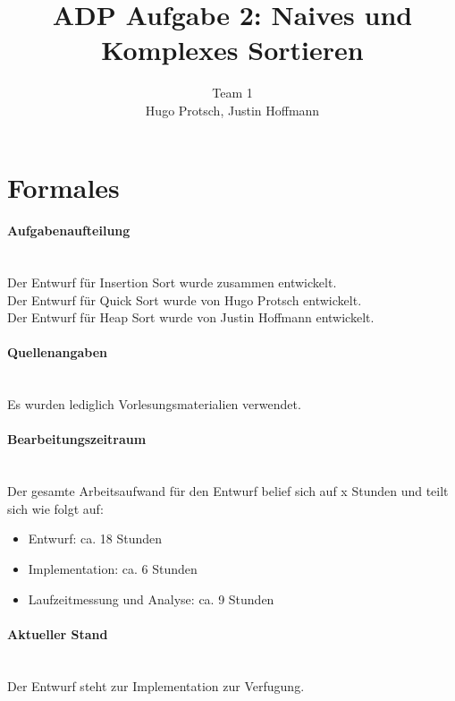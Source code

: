 \documentclass[11pt]{article}
\title{ADP Aufgabe 2: Naives und Komplexes Sortieren}
\author{Team 1\\Hugo Protsch, Justin Hoffmann}
\begin{document}
    \maketitle

    \tableofcontents

    \newpage


    \section{Formales}\label{sec:Formales}

    \paragraph*{Aufgabenaufteilung}\mbox{}\\
    Der Entwurf für Insertion Sort wurde zusammen entwickelt.\\
    Der Entwurf für Quick Sort wurde von Hugo Protsch entwickelt.\\
    Der Entwurf für Heap Sort wurde von Justin Hoffmann entwickelt.

    \paragraph*{Quellenangaben}\mbox{}\\
    Es wurden lediglich Vorlesungsmaterialien verwendet.

    \paragraph*{Bearbeitungszeitraum}\mbox{}\\
    Der gesamte Arbeitsaufwand für den Entwurf belief sich auf x Stunden%
    und teilt sich wie folgt auf:
    \begin{itemize}
        \setlength\itemsep{0em}
        \item Entwurf: ca. 18 Stunden
        \item Implementation: ca. 6 Stunden %
        \item Laufzeitmessung und Analyse: ca. 9 Stunden
    \end{itemize}

    \paragraph*{Aktueller Stand}\mbox{}\\
    Der Entwurf steht zur Implementation zur Verfugung.
\end{document}
